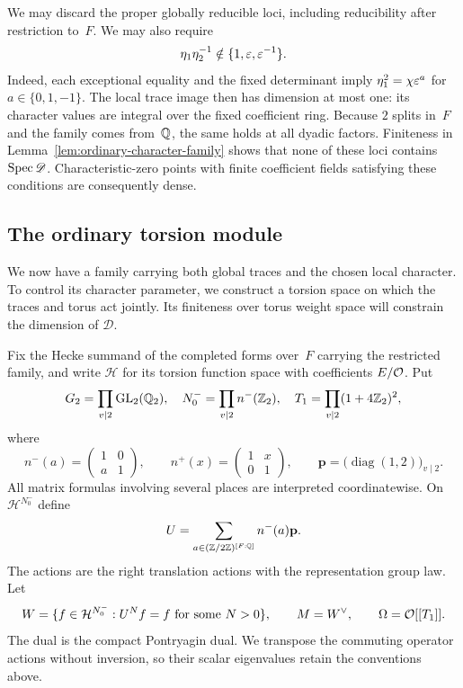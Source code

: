 We may discard the proper globally reducible loci, including reducibility
after restriction to~$F$.  We may also require
\begin{equation}\label{eq:generic-ordinary-ratios}
 \eta_1\eta_2^{-1}\notin\{1,\varepsilon,\varepsilon^{-1}\}.
\end{equation}
Indeed, each exceptional equality and the fixed determinant imply
$\eta_1^2=\chi\varepsilon^a$ for $a\in\{0,1,-1\}$.  The local trace image
then has dimension at most one: its character values are integral over
the fixed coefficient ring.  Because $2$ splits in~$F$ and the family
comes from~$\mathbb Q$, the same holds at all dyadic factors.  Finiteness in
Lemma~\ref{lem:ordinary-character-family} shows that none of these loci
contains $\operatorname{Spec}\mathscr D$.  Characteristic-zero points with finite
coefficient fields satisfying these conditions are consequently dense.

\subsection{The ordinary torsion module}

We now have a family carrying both global traces and the chosen local
character.  To control its character parameter, we construct a torsion
space on which the traces and torus act jointly.  Its finiteness over
torus weight space will constrain the dimension of $\mathscr D$.

Fix the Hecke summand of the completed forms over~$F$ carrying the
restricted family, and write
$\mathcal H$ for its torsion function space with coefficients
$E/\mathcal O$.  Put
\[
 G_2=\prod_{v\mid2}\operatorname{GL}_2(\mathbb Q_2),\quad
 N_0^-=\prod_{v\mid2}n^-(\mathbb Z_2),\quad
 T_1=\prod_{v\mid2}(1+4\mathbb Z_2)^2,
\]
where
\[
 n^-(a)=\begin{pmatrix}1&0\\a&1\end{pmatrix},\qquad
 n^+(x)=\begin{pmatrix}1&x\\0&1\end{pmatrix},\qquad
 \mathbf p=\bigl(\operatorname{diag}(1,2)\bigr)_{v\mid2}.
\]
All matrix formulas involving several places are interpreted
coordinatewise.  On $\mathcal H^{N_0^-}$ define
\begin{equation}\label{eq:ordinary-U}
 U=\sum_{a\in(\mathbb Z/2\mathbb Z)^{[F:\mathbb Q]}}n^-(a)\mathbf p.
\end{equation}
The actions are the right translation actions with the representation
group law.  Let
\[
 W=\{f\in\mathcal H^{N_0^-}:U^Nf=f\text{ for some }N>0\},
 \qquad M=W^\vee,
 \qquad \Omega=\mathcal O[[T_1]].
\]
The dual is the compact Pontryagin dual.  We transpose the commuting
operator actions without inversion, so their scalar eigenvalues retain
the conventions above.

